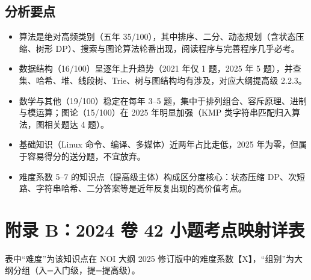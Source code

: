 \documentclass[11pt]{ctexart}
\begin{document}
\subsection{分析要点}
\begin{itemize}[leftmargin=2em, itemsep=1pt]
    \item 算法是绝对高频类别（五年 35/100），其中排序、二分、动态规划（含状态压缩、树形 DP）、搜索与图论算法轮番出现，阅读程序与完善程序几乎必考。
    \item 数据结构（16/100）呈逐年上升趋势（2021 年仅 1 题，2025 年 5 题），并查集、哈希、堆、线段树、Trie、树与图结构均有涉及，对应大纲提高级 2.2.3。
    \item 数学与其他（19/100）稳定在每年 3--5 题，集中于排列组合、容斥原理、进制与模运算；图论（15/100）在 2025 年明显加强（KMP 类字符串匹配归入算法，图相关题达 4 题）。
    \item 基础知识（Linux 命令、编译、多媒体）近两年占比走低，2025 年为零，但属于容易得分的送分题，不宜放弃。
    \item 难度系数 5--7 的知识点（提高级主体）构成区分度核心：状态压缩 DP、次短路、字符串哈希、二分答案等是近年反复出现的高价值考点。
\end{itemize}

\clearpage
\section{附录 B：2024 卷 42 小题考点映射详表}
表中“难度”为该知识点在 NOI 大纲 2025 修订版中的难度系数【X】，“组别”为大纲分组（入=入门级，提=提高级）。
\end{document}
